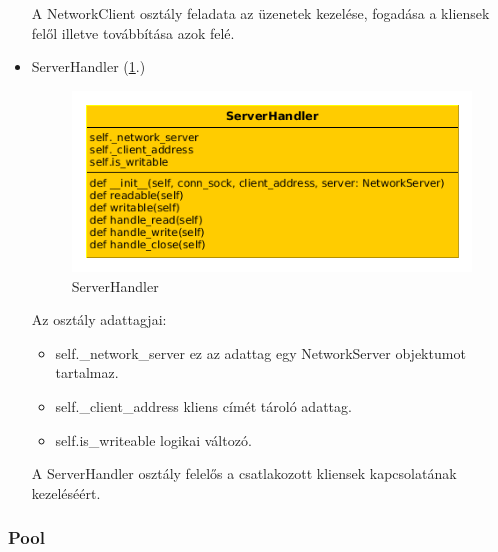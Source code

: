 \documentclass[a4paper,12pt,oneside]{report}
\begin{document}
\begin{itemize}
            A NetworkClient osztály feladata az üzenetek kezelése, fogadása a kliensek felől illetve továbbítása azok felé.
            
        \item ServerHandler (\ref{fig:serverhandler}.)
            \begin{figure}[h]
              \includegraphics[width=13cm,keepaspectratio]{serverhandler.png}
              \caption{ServerHandler}
              \label{fig:serverhandler}
            \end{figure}
            
            Az osztály adattagjai:
            \begin{itemize}
                \itemsep0em
                    \item self.\_network\_server ez az adattag egy NetworkServer objektumot tartalmaz.
                    \item self.\_client\_address kliens címét tároló adattag.
                    \item self.is\_writeable logikai változó.
            \end{itemize}

        A ServerHandler osztály felelős a csatlakozott kliensek kapcsolatának kezeléséért.
            
\end{itemize}
\newpage
\subsubsection{Pool}
\end{document}
